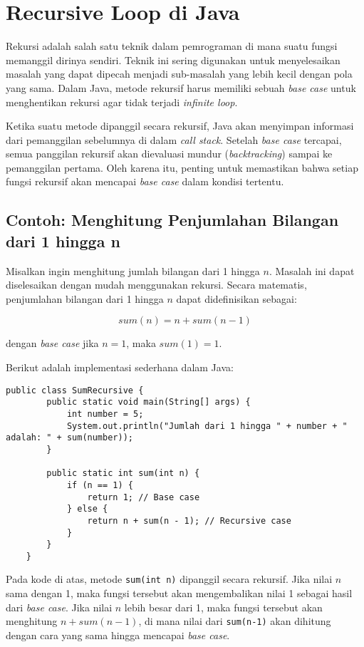 \section{Recursive Loop di Java}

Rekursi adalah salah satu teknik dalam pemrograman di mana suatu fungsi memanggil dirinya sendiri. Teknik ini sering digunakan untuk menyelesaikan masalah yang dapat dipecah menjadi sub-masalah yang lebih kecil dengan pola yang sama. Dalam Java, metode rekursif harus memiliki sebuah \textit{base case} untuk menghentikan rekursi agar tidak terjadi \textit{infinite loop}. 

Ketika suatu metode dipanggil secara rekursif, Java akan menyimpan informasi dari pemanggilan sebelumnya di dalam \textit{call stack}. Setelah \textit{base case} tercapai, semua panggilan rekursif akan dievaluasi mundur (\textit{backtracking}) sampai ke pemanggilan pertama. Oleh karena itu, penting untuk memastikan bahwa setiap fungsi rekursif akan mencapai \textit{base case} dalam kondisi tertentu.

\subsection{Contoh: Menghitung Penjumlahan Bilangan dari 1 hingga n}

Misalkan ingin menghitung jumlah bilangan dari 1 hingga \( n \). Masalah ini dapat diselesaikan dengan mudah menggunakan rekursi. Secara matematis, penjumlahan bilangan dari 1 hingga \( n \) dapat didefinisikan sebagai:

\[
sum(n) = n + sum(n-1)
\]

dengan \textit{base case} jika \( n = 1 \), maka \( sum(1) = 1 \).

Berikut adalah implementasi sederhana dalam Java:

\begin{lstlisting}[style=JavaStyle]
	public class SumRecursive {
		public static void main(String[] args) {
			int number = 5;
			System.out.println("Jumlah dari 1 hingga " + number + " adalah: " + sum(number));
		}
		
		public static int sum(int n) {
			if (n == 1) {
				return 1; // Base case
			} else {
				return n + sum(n - 1); // Recursive case
			}
		}
	}
\end{lstlisting}

Pada kode di atas, metode \texttt{sum(int n)} dipanggil secara rekursif. Jika nilai \( n \) sama dengan 1, maka fungsi tersebut akan mengembalikan nilai 1 sebagai hasil dari \textit{base case}. Jika nilai \( n \) lebih besar dari 1, maka fungsi tersebut akan menghitung \( n + sum(n-1) \), di mana nilai dari \texttt{sum(n-1)} akan dihitung dengan cara yang sama hingga mencapai \textit{base case}.

